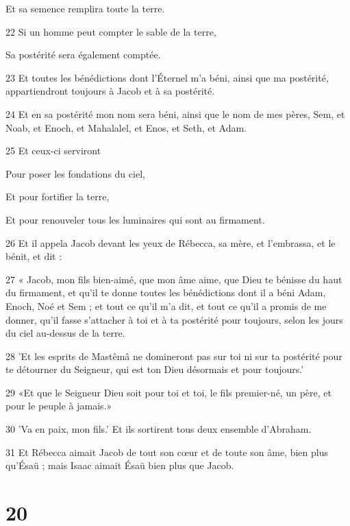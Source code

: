 \par     Et sa semence remplira toute la terre.
\par    
\par 22 Si un homme peut compter le sable de la terre,  
\par     Sa postérité sera également comptée.
\par    
\par 23 Et toutes les bénédictions dont l'Éternel m'a béni, ainsi que ma postérité, appartiendront toujours à Jacob et à sa postérité.
\par 24 Et en sa postérité mon nom sera béni, ainsi que le nom de mes pères, Sem, et Noab, et Enoch, et Mahalalel, et Enos, et Seth, et Adam.
\par 25 Et ceux-ci serviront
\par    
\par     Pour poser les fondations du ciel,  
\par     Et pour fortifier la terre,  
\par     Et pour renouveler tous les luminaires qui sont au firmament.
\par    
\par 26 Et il appela Jacob devant les yeux de Rébecca, sa mère, et l'embrassa, et le bénit, et dit :
\par 27 « Jacob, mon fils bien-aimé, que mon âme aime, que Dieu te bénisse du haut du firmament, et qu'il te donne toutes les bénédictions dont il a béni Adam, Enoch, Noé et Sem ; et tout ce qu'il m'a dit, et tout ce qu'il a promis de me donner, qu'il fasse s'attacher à toi et à ta postérité pour toujours, selon les jours du ciel au-dessus de la terre.
\par 28 'Et les esprits de Mastêmâ ne domineront pas sur toi ni sur ta postérité pour te détourner du Seigneur, qui est ton Dieu désormais et pour toujours.'
\par 29 «Et que le Seigneur Dieu soit pour toi et toi, le fils premier-né, un père, et pour le peuple à jamais.»
\par 30 'Va en paix, mon fils.' Et ils sortirent tous deux ensemble d’Abraham.
\par 31 Et Rébecca aimait Jacob de tout son cœur et de toute son âme, bien plus qu'Ésaü ; mais Isaac aimait Ésaü bien plus que Jacob.

\chapter{20}

